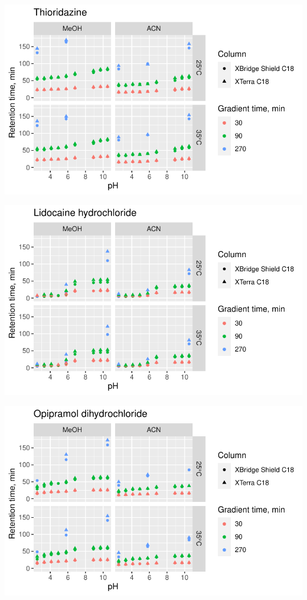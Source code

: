 \documentclass[
  letterpaper,
  DIV=11,
  numbers=noendperiod]{scrreprt}
\begin{document}
\includegraphics{index_files/figure-pdf/unnamed-chunk-4-81.pdf}

\includegraphics{index_files/figure-pdf/unnamed-chunk-4-82.pdf}

\includegraphics{index_files/figure-pdf/unnamed-chunk-4-83.pdf}
\end{document}

